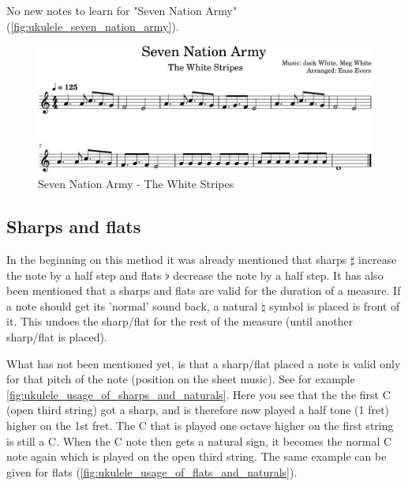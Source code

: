
\newpage

No new notes to learn for "Seven Nation Army" (\autoref{fig:ukulele_seven_nation_army}).

\begin{figure}[h]
	\centering
	\includegraphics[width=\textwidth]{../../MuseScore/Ukulele/Ukulele_SevenNationArmy-TheWhiteStripes.png}
	\caption{Seven Nation Army - The White Stripes}
	\label{fig:ukulele_seven_nation_army}
\end{figure}

\newpage

\subsection{Sharps and flats}

In the beginning on this method it was already mentioned that sharps $\sharp$ increase the note by a half step and flats $\flat$ decrease the note by a half step. It has also been mentioned that a sharps and flats are valid for the duration of a measure. If a note should get its 'normal' sound back, a natural $\natural$ symbol is placed is front of it. This undoes the sharp/flat for the rest of the measure (until another sharp/flat is placed).

What has not been mentioned yet, is that a sharp/flat placed a note is valid only for that pitch of the note (position on the sheet music). See for example \autoref{fig:ukulele_usage_of_sharps_and_naturals}. Here you see that the the first C (open third string) got a sharp, and is therefore now played a half tone (1 fret) higher on the 1st fret. The C that is played one octave higher on the first string is still a C. When the C note then gets a natural sign, it becomes the normal C note again which is played on the open third string. The same example can be given for flats (\autoref{fig:ukulele_usage_of_flats_and_naturals}).

